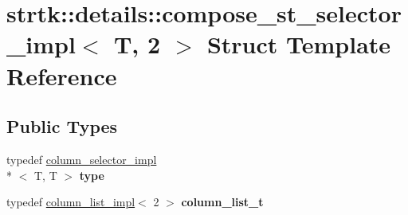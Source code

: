 \hypertarget{structstrtk_1_1details_1_1compose__st__selector__impl_3_01T_00_012_01_4}{\section{strtk\-:\-:details\-:\-:compose\-\_\-st\-\_\-selector\-\_\-impl$<$ T, 2 $>$ Struct Template Reference}
\label{structstrtk_1_1details_1_1compose__st__selector__impl_3_01T_00_012_01_4}
}
\subsection*{Public Types}
\begin{DoxyCompactItemize}
\item 
\hypertarget{structstrtk_1_1details_1_1compose__st__selector__impl_3_01T_00_012_01_4_abbaac6b4570940eccb413329e496dab1}{typedef \hyperlink{classstrtk_1_1details_1_1column__selector__impl}{column\-\_\-selector\-\_\-impl}\\*
$<$ T, T $>$ {\bfseries type}}\label{structstrtk_1_1details_1_1compose__st__selector__impl_3_01T_00_012_01_4_abbaac6b4570940eccb413329e496dab1}

\item 
\hypertarget{structstrtk_1_1details_1_1compose__st__selector__impl_3_01T_00_012_01_4_a7b69d2e7b0ce79db71935c1d95737260}{typedef \hyperlink{structstrtk_1_1details_1_1column__list__impl}{column\-\_\-list\-\_\-impl}$<$ 2 $>$ {\bfseries column\-\_\-list\-\_\-t}}\label{structstrtk_1_1details_1_1compose__st__selector__impl_3_01T_00_012_01_4_a7b69d2e7b0ce79db71935c1d95737260}

\end{DoxyCompactItemize}
